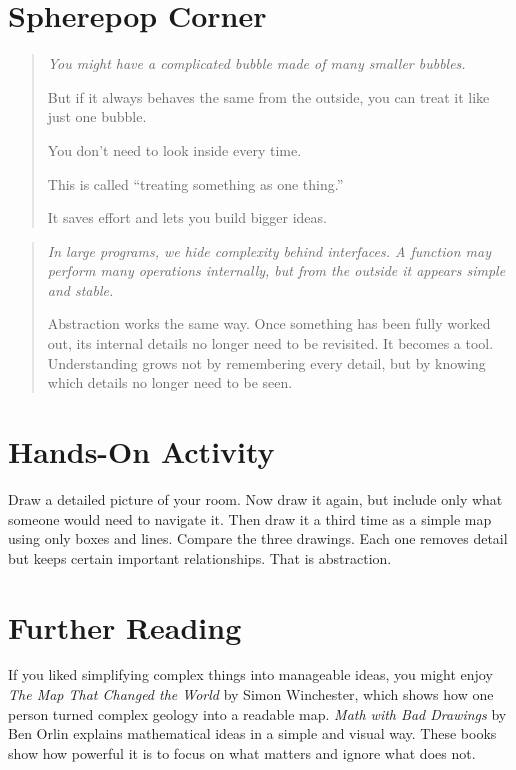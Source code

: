 \documentclass[11pt]{book}
\theoremstyle{definition}
\theoremstyle{remark}
\newenvironment{literaryaside}
  {\begin{quote}\small\itshape}
  {\end{quote}}
\newenvironment{spherepopjunior}
  {\begin{quote}\small\itshape}
  {\end{quote}}
\begin{document}
\section*{Spherepop Corner}

\begin{spherepopjunior}
You might have a complicated bubble made of many smaller bubbles.

But if it always behaves the same from the outside, you can treat it
like just one bubble.

You don't need to look inside every time.

This is called ``treating something as one thing.''

It saves effort and lets you build bigger ideas.
\end{spherepopjunior}

\begin{literaryaside}
In large programs, we hide complexity behind interfaces. A function may
perform many operations internally, but from the outside it appears
simple and stable.

Abstraction works the same way. Once something has been fully worked
out, its internal details no longer need to be revisited. It becomes
a tool. Understanding grows not by remembering every detail, but by
knowing which details no longer need to be seen.
\end{literaryaside}

\section*{Hands-On Activity}

Draw a detailed picture of your room. Now draw it again, but include
only what someone would need to navigate it. Then draw it a third time
as a simple map using only boxes and lines. Compare the three drawings.
Each one removes detail but keeps certain important relationships.
That is abstraction.

\section*{Further Reading}

If you liked simplifying complex things into manageable ideas, you
might enjoy \textit{The Map That Changed the World} by Simon Winchester,
which shows how one person turned complex geology into a readable map.
\textit{Math with Bad Drawings} by Ben Orlin explains mathematical ideas
in a simple and visual way. These books show how powerful it is to focus
on what matters and ignore what does not.
\end{document}
